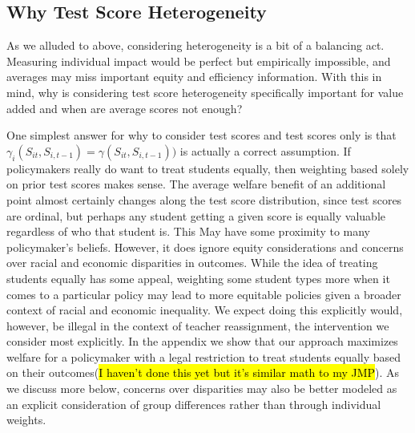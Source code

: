 \documentclass[12pt]{article}
\theoremstyle{definition}
\theoremstyle{definition}
\theoremstyle{definition}
\theoremstyle{definition}
\begin{document}
    \subsection{Why Test Score Heterogeneity}
    
    
    As we alluded to above, considering heterogeneity is a bit of a balancing act. Measuring individual impact would be perfect but empirically impossible, and averages may miss important equity and efficiency information. With this in mind, why is considering test score heterogeneity specifically important for value added and when are average scores not enough? 
    
    One simplest answer for why to consider test scores and test scores only is that $\gamma_i(S_{it}, S_{i,t-1}) = \gamma(S_{it}, S_{i,t-1}))$ is actually a correct assumption. If policymakers really do want to treat students equally, then weighting based solely on prior test scores makes sense. The average welfare benefit of an additional point almost certainly changes along the test score distribution, since test scores are ordinal, but perhaps any student getting a given score is equally valuable regardless of who that student is. This May have some proximity to many policymaker's beliefs. However, it does ignore equity considerations and concerns over racial and economic disparities in outcomes. While the idea of treating students equally has some appeal, weighting some student types more when it comes to a particular policy may lead to more equitable policies given a broader context of racial and economic inequality. We expect doing this explicitly would, however, be illegal in the context of teacher reassignment, the intervention we consider most explicitly. In the appendix we show that our approach maximizes welfare for a policymaker with a legal restriction to treat students equally based on their outcomes(\hl{I haven't done this yet but it's similar math to my JMP}). As we discuss more below, concerns over disparities may also be better modeled as an explicit consideration of group differences rather than through individual weights. 
    
\end{document}
